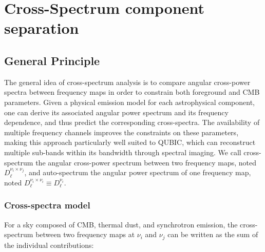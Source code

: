 \documentclass[../../thesis.tex]{subfiles}
\begin{document}

\section{Cross-Spectrum component separation}

\subsection{General Principle}

The general idea of cross-spectrum analysis is to compare angular cross-power spectra between frequency maps in order to constrain both foreground and CMB parameters. Given a physical emission model for each astrophysical component, one can derive its associated angular power spectrum and its frequency dependence, and thus predict the corresponding cross-spectra. The availability of multiple frequency channels improves the constraints on these parameters, making this approach particularly well suited to QUBIC, which can reconstruct multiple sub-bands within its bandwidth through spectral imaging. We call cross-spectrum the angular cross-power spectrum between two frequency maps, noted $D_\ell^{\nu_i \times \nu_j}$, and auto-spectrum the angular power spectrum of one frequency map, noted $D_\ell^{\nu_i \times \nu_i} \equiv D_\ell^{\nu_i}$.

\subsubsection{Cross-spectra model}

For a sky composed of CMB, thermal dust, and synchrotron emission, the cross-spectrum between two frequency maps at $\nu_i$ and $\nu_j$ can be written as the sum of the individual contributions:
\end{document}
